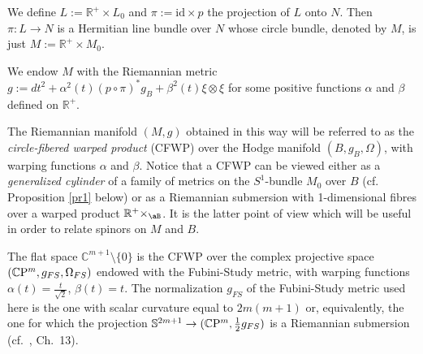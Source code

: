 \documentclass[12pt]{amsart}
\begin{document}
We define $L:={{\mathbb R}}^+\times L_0$ and $\pi:=\mathrm{id}\times
p$ the projection of $L$ onto $N$. 
Then $\pi:L\to N$ is a Hermitian line 
bundle over $N$ whose circle bundle, denoted by $M$, is just
$M:={{\mathbb R}}^+\times M_0$.  

We endow $M$ with the Riemannian metric
$g:=dt^2+{\alpha} ^2(t)(p\circ \pi)^*g_B+
{\beta}^2(t)\xi\otimes\xi$ for some positive functions ${\alpha}$ and ${\beta}$ 
defined on ${{\mathbb R}}^+$. 

The Riemannian manifold $(M,g)$ obtained in this way will be referred
to as the {\em circle-fibered warped product} (CFWP) over the Hodge manifold 
$(B,g_B,{\Omega})$, with warping functions ${\alpha}$ and ${\beta}$. Notice that a CFWP
can be viewed 
either as a {\em generalized cylinder} of a family of metrics on the
$S^1$-bundle 
$M_0$ over $B$ (cf. Proposition \ref{pr1} below) or as a Riemannian submersion
with 1-dimensional fibres over a warped product
${{\mathbb R}}^+\times_\aB$. It is the latter  
point of view which will be useful in order to relate spinors on $M$ and $B$.

\begin{example}\label{ex1}
The flat space ${{\mathbb C}}^{m+1}\setminus \{0\}$ is the CFWP over the 
complex projective space 
$({{\mathbb C}} {\rm P}^m, g_{FS},{\Omega}_{FS})$ endowed with
the Fubini-Study metric, with warping functions ${\alpha}(t)=\frac{t}{\sqrt{2}}$, 
${\beta}(t)=t$. The normalization $g_{FS}$ of the Fubini-Study metric used here is
the one with scalar curvature equal to $2m(m+1)$ or, equivalently, the
one for which the projection $\mathbb{S}^{2m+1}\to({{\mathbb C}} {\rm P}^m,
\frac12g_{FS})$ is a Riemannian submersion (cf.\ \cite{m}, Ch.\ 13).
\end{example}
\end{document}
